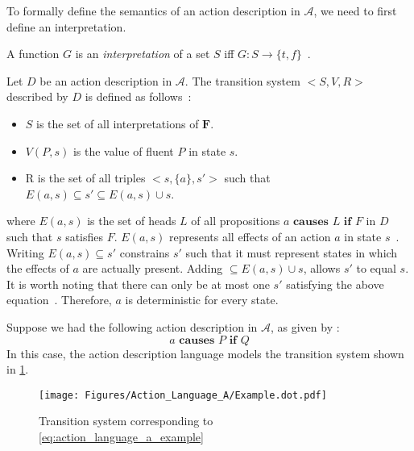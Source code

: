 To formally define the semantics of an action description in $\mathcal{A}$, we need to first define an interpretation.

\begin{definition}
    \label{def:interpretation}
    A function $G$ is an \textit{interpretation} of a set $S$ iff $G: S \rightarrow \{t, f\}$~\citep{gelfond_action_1998}.
\end{definition}

\begin{definition}
    Let $ D $ be an action description in $\mathcal{A}$.
    The transition system $ <S, V, R> $ described by $ D $ is defined as follows~\citep{gelfond_action_1998}:

    \begin{itemize}
        \item $ S $ is the set of all interpretations of $ \boldsymbol{F} $.
        \item $ V(P, s) $ is the value of fluent $P$ in state $s$.
        \item R is the set of all triples $ <s, \{a\}, s'> $ such that $ E(a,s) \subseteq s' \subseteq E(a,s) \cup s $.
    \end{itemize}
    where $ E(a, s) $ is the set of heads $ L $ of all propositions $ a \textbf{ causes } L \textbf{ if } F $ in $ D $ such that $ s $ satisfies $ F $.
    $ E(a, s) $ represents all effects of an action $ a $ in state $ s $~\citep{gelfond_action_1998}.
    Writing $ E\left(a,s\right)\subseteq s' $ constrains $ s' $ such that it must represent states in which the effects of $ a $ are actually present.
    Adding $ \subseteq E\left(a,s\right)\cup s $, allows $ s' $ to equal $ s $.
    It is worth noting that there can only be at most one $ s' $ satisfying the above equation~\citep{gelfond_action_1998}.
    Therefore, $ a $ is deterministic for every state.
\end{definition}

Suppose we had the following action description in $\mathcal{A}$, as given by \citet{gelfond_action_1998}:
\begin{equation}
    \label{eq:action_language_a_example}
    a \textbf{ causes } P \textbf{ if } Q
\end{equation}
In this case, the action description language models the transition system shown in \cref{fig:action_language_a_example}.

\begin{figure}[h]
    \centering
    \texttt{[image: Figures/Action\_Language\_A/Example.dot.pdf]}
    \caption{Transition system corresponding to \cref{eq:action_language_a_example}}
    \label{fig:action_language_a_example}
\end{figure}


